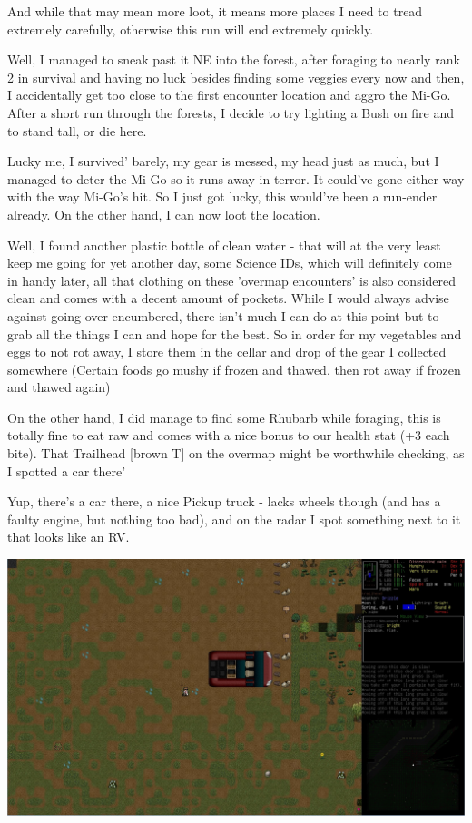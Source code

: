 \documentclass[11pt]{report}
\begin{document}
And while that may mean more loot, it means more places I need to tread extremely carefully, otherwise this run will end extremely quickly.

Well, I managed to sneak past it NE into the forest, after foraging to nearly rank 2 in survival and having no luck besides finding some veggies every now and then, I accidentally get too close to the first encounter location and aggro the Mi-Go. After a short run through the forests, I decide to try lighting a Bush on fire and to stand tall, or die here.

Lucky me, I survived' barely, my gear is messed, my head just as much, but I managed to deter the Mi-Go so it runs away in terror. It could've gone either way with the way Mi-Go's hit. So I just got lucky, this would've been a run-ender already. On the other hand, I can now loot the location.

Well, I found another plastic bottle of clean water - that will at the very least keep me going for yet another day, some Science IDs, which will definitely come in handy later, all that clothing on these 'overmap encounters' is also considered clean and comes with a decent amount of pockets. While I would always advise against going over encumbered, there isn't much I can do at this point but to grab all the things I can and hope for the best.
So in order for my vegetables and eggs to not rot away, I store them in the cellar and drop of the gear I collected somewhere (Certain foods go mushy if frozen and thawed, then rot away if frozen and thawed again)

On the other hand, I did manage to find some Rhubarb while foraging, this is totally fine to eat raw and comes with a nice bonus to our health stat (+3 each bite). That Trailhead [brown T] on the overmap might be worthwhile checking, as I spotted a car there'

Yup, there's a car there, a nice Pickup truck - lacks wheels though (and has a faulty engine, but nothing too bad), and on the radar I spot something next to it that looks like an RV.

\includegraphics[width=\textwidth]{10}
\end{document}
